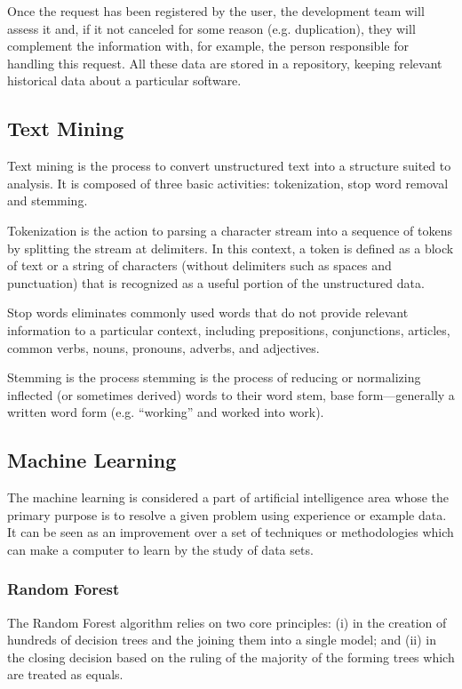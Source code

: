 \documentclass[10pt, conference]{IEEEtran}
\begin{document}
Once the request has been registered by the user, the development team will assess it and, if it not canceled for some reason (e.g. duplication), they will complement the information with, for example, the person responsible for handling this request. All these data are stored in a repository, keeping relevant historical data about a particular software.

\subsection{Text Mining}
Text mining is the process to convert unstructured text into a structure suited to analysis\cite{Feldman2007}. It is composed of three basic activities\cite{Williams2011}: tokenization, stop word removal and stemming.

Tokenization is the action to parsing a character stream into a sequence of tokens by splitting the stream at delimiters. In this context, a token is defined as a block of text or a string of characters (without delimiters such as spaces and punctuation) that is recognized as a useful portion of the unstructured data.

Stop words eliminates commonly used words that do not provide relevant information to a particular context, including prepositions, conjunctions, articles, common verbs, nouns, pronouns, adverbs, and adjectives.

Stemming is the process stemming is the process of reducing or normalizing inflected (or sometimes derived) words to their word stem, base form—generally a written word form (e.g. “working” and worked into work).

\subsection{Machine Learning}
The machine learning is considered a part of artificial intelligence area whose the primary purpose is to resolve a given problem using experience or example data\cite{Surya2016}. It can be seen as an improvement over a set of techniques or methodologies which can make a computer to learn by the study of data sets.

\subsubsection{Random Forest}
The Random Forest algorithm\cite{Breiman2001} relies on two core principles: (i) in the creation of hundreds of decision trees and the joining them into a single model; and (ii) in the closing decision based on the ruling of the majority of the forming trees which are treated as equals.
\end{document}
